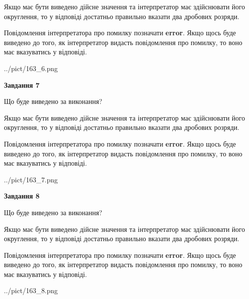 \documentclass[12pt, ukrainian]{article}
\begin{document}
{\begin {Large}
Якщо має бути виведено дійсне значення та інтерпретатор має здійснювати його округлення, 
то у відповіді достатньо правильно вказати два дробових розряди.

Повідомлення інтерпретатора про помилку позначати \textbf{error}.
Якщо щось буде виведено до того, як інтерпретатор видасть повідомлення про помилку, 
то воно має вказуватись у відповіді. \par

\begin{center}
	{../pict/163_6.png}
\end{center}
\newpage

{\begin {center}\textbf{Завдання 7}\end {center}}\par
Що буде виведено за виконання? \par

Якщо має бути виведено дійсне значення та інтерпретатор має здійснювати його округлення, 
то у відповіді достатньо правильно вказати два дробових розряди.

Повідомлення інтерпретатора про помилку позначати \textbf{error}.
Якщо щось буде виведено до того, як інтерпретатор видасть повідомлення про помилку, 
то воно має вказуватись у відповіді. \par

\begin{center}
	{../pict/163_7.png}
\end{center}
\newpage

{\begin {center}\textbf{Завдання 8}\end {center}}\par
Що буде виведено за виконання? \par

Якщо має бути виведено дійсне значення та інтерпретатор має здійснювати його округлення, 
то у відповіді достатньо правильно вказати два дробових розряди.

Повідомлення інтерпретатора про помилку позначати \textbf{error}.
Якщо щось буде виведено до того, як інтерпретатор видасть повідомлення про помилку, 
то воно має вказуватись у відповіді. \par

\begin{center}
	{../pict/163_8.png}
\end{center}
\newpage


\end{Large}}
\end{document}
